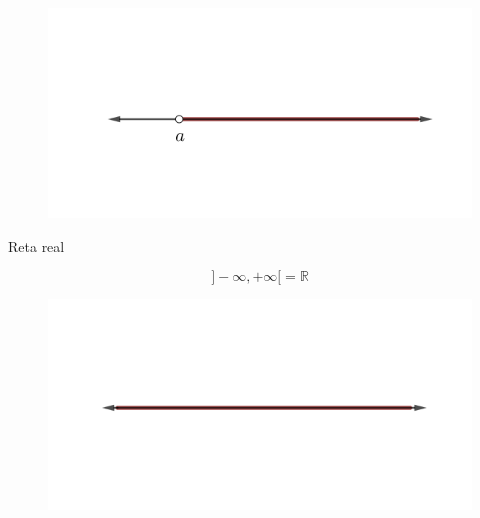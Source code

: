 \begin{itemize}
\begin{figure}[H]
	\includegraphics[scale=3.5]{imagens/semi-a-direita-aberta.png}

\end{figure}
\begin{center}
	Reta real
\end{center}

$$]-\infty,+\infty[ = \mathbb{R}$$
\begin{figure}[H]
	\centering
	
	\includegraphics[scale=3.5]{imagens/reta-real.png}

\end{figure}

\end{itemize}

